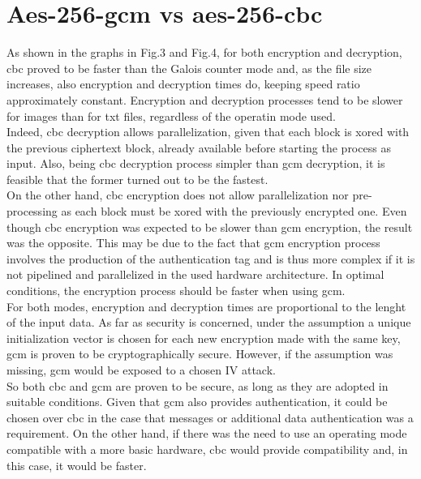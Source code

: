 \documentclass{article}
\begin{document}
\section{Aes-256-gcm vs aes-256-cbc}
As shown in the graphs in Fig.3 and Fig.4, for both encryption and decryption, cbc proved to be faster than the Galois counter mode and, as the file size increases, also encryption and decryption times do, keeping speed ratio approximately constant. Encryption and decryption processes tend to be slower for images than for txt files, regardless of the operatin mode used.\\
Indeed, cbc decryption allows parallelization, given that each block is xored with the previous ciphertext block, already available before starting the process as input. Also, being cbc decryption process simpler than gcm decryption, it is feasible that the former turned out to be the fastest.\\
On the other hand, cbc encryption does not allow parallelization nor pre-processing as each block must be xored with the previously encrypted one. Even though cbc encryption was expected to be slower than gcm encryption, the result was the opposite. This may be due to the fact that gcm encryption process involves the production of the authentication tag and is thus more complex if it is not pipelined and parallelized in the used hardware architecture. In optimal conditions, the encryption process should be faster when using gcm.\\
For both modes, encryption and decryption times are proportional to the lenght of the input data.
As far as security is concerned, under the assumption a unique initialization vector is chosen for each new encryption made with the same key, gcm is proven to be cryptographically secure. However, if the assumption was missing, gcm would be exposed to a chosen IV attack. \\
So both cbc and gcm are proven to be secure, as long as they are adopted in suitable conditions. Given that gcm also provides authentication, it could be chosen over cbc in the case that messages or additional data authentication was a requirement. On the other hand, if there was the need to use an operating mode compatible with a more basic hardware, cbc would provide compatibility and, in this case, it would be faster.
\end{document}
